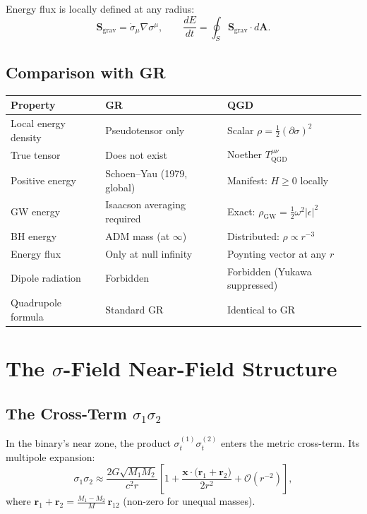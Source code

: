 \documentclass[12pt,a4paper]{article}
\begin{document}
Energy flux is locally defined at any radius:
\begin{equation}
  \boxed{\mathbf{S}_\mathrm{grav} = \dot\sigma_\mu\nabla\sigma^\mu,
    \qquad \frac{dE}{dt} = \oint_S \mathbf{S}_\mathrm{grav}\cdot d\mathbf{A}.}
\end{equation}

\subsection{Comparison with GR}

\begin{center}
\renewcommand{\arraystretch}{1.2}
\begin{tabular}{p{3.5cm}p{4.5cm}p{4.5cm}}
\toprule
Property & GR & QGD\\
\midrule
Local energy density & Pseudotensor only & Scalar $\rho = \tfrac{1}{2}(\partial\sigma)^2$\\
True tensor & Does not exist & Noether $T^{\mu\nu}_\mathrm{QGD}$\\
Positive energy & Schoen--Yau (1979, global) & Manifest: $H\geq 0$ locally\\
GW energy & Isaacson averaging required & Exact: $\rho_\mathrm{GW} = \tfrac{1}{2}\omega^2|\epsilon|^2$\\
BH energy & ADM mass (at $\infty$) & Distributed: $\rho\propto r^{-3}$\\
Energy flux & Only at null infinity & Poynting vector at any $r$\\
Dipole radiation & Forbidden & Forbidden (Yukawa suppressed)\\
Quadrupole formula & Standard GR & Identical to GR\\
\bottomrule
\end{tabular}
\end{center}

\section{The $\sigma$-Field Near-Field Structure}

\subsection{The Cross-Term $\sigma_1\sigma_2$}

In the binary's near zone, the product $\sigma_t^{(1)}\sigma_t^{(2)}$ enters the
metric cross-term. Its multipole expansion:
\begin{equation}
  \sigma_1\sigma_2 \approx \frac{2G\sqrt{M_1M_2}}{c^2 r}
  \left[1 + \frac{\mathbf{x}\cdot\bigl(\mathbf{r}_1+\mathbf{r}_2\bigr)}{2r^2}
    + \mathcal{O}(r^{-2})\right],
\end{equation}
where $\mathbf{r}_1+\mathbf{r}_2 = \frac{M_1-M_2}{M}\,\mathbf{r}_{12}$ (non-zero
for unequal masses).
\end{document}
